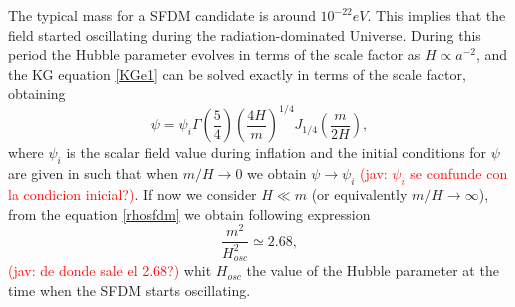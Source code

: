 \documentclass[amssymb,twocolumn,prd,nofootinbib,showpacs]{revtex4-1}
\newcommand{\jav}[1]{\textcolor{red}{(jav: #1)}}
\begin{document}
The typical mass for a SFDM candidate is around $10^{-22} eV$. 
This implies that the field started oscillating during the radiation-dominated Universe. 
During this period the Hubble parameter evolves in terms of the scale factor as $H\propto a^{-2}$, 
and the KG equation \eqref{KGe1} can be solved exactly in terms of the scale factor,  obtaining
%
\begin{equation}
\psi = \psi_i\Gamma\left(\frac{5}{4}\right)\left(\frac{4H}{m}\right)^{1/4}J_{1/4}\left(\frac{m}{2H}\right),
\end{equation}
%
where $\psi_i$ is the scalar field value during inflation and the initial conditions for $\psi$ are given in 
such that when $m/H\rightarrow 0$ we obtain $\psi\rightarrow\psi_i$ \jav{$\psi_i$ se confunde con la condicion inicial?}. 
If now we consider $H\ll m$ (or equivalently $m/H\rightarrow \infty$),  from the equation \eqref{rhosfdm} 
we obtain following expression 
%
\begin{equation}\label{m_osc}
\frac{m^2}{H_{osc}^2}\simeq 2.68,
\end{equation}
\jav{de donde sale el 2.68?}
whit $H_{osc}$ the value of the Hubble parameter at the time when the SFDM starts oscillating.
\end{document}
